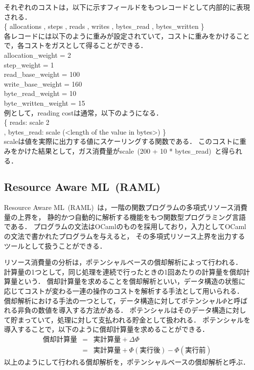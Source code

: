 \documentclass{kuisthesis}
\begin{document}
それぞれのコストは，以下に示すフィールドをもつレコードとして内部的に表現される．\\
\hspace{15pt}\{ allocations 
, steps 
, reads 
, writes 
, bytes\_read 
, bytes\_written 
\} \\
各レコードには以下のように重みが設定されていて，コストに重みをかけることで，各コストをガスとして得ることができる．\\
\hspace{15pt} allocation\_weight = 2 \\
\hspace{15pt} step\_weight = 1 \\
\hspace{15pt} read\_base\_weight = 100 \\
\hspace{15pt} write\_base\_weight = 160 \\
\hspace{15pt} byte\_read\_weight = 10 \\
\hspace{15pt} byte\_written\_weight = 15 \\
例として，reading costは通常，以下のようになる． \\
\hspace{15pt} \{ reads: scale 2 \\
\hspace{15pt} , bytes\_read: scale (<length of the value in bytes>) \} \\
scaleは値を実際に出力する値にスケーリングする関数である．
このコストに重みをかけた結果として，ガス消費量がscale\ (200 + 10 * bytes\_read)\ と得られる．




\subsection{Resource Aware ML\ (RAML)}\label{subsec-pre-raml}
Resource Aware ML\ (RAML)\ は，一階の関数プログラムの多項式リソース消費量の上界を，
静的かつ自動的に解析する機能をもつ関数型プログラミング言語である．
プログラムの文法はOCamlのものを採用しており，入力としてOCamlの文法で書かれたプログラムを与えると，
その多項式リソース上界を出力するツールとして扱うことができる．

リソース消費量の分析は，ポテンシャルベースの償却解析によって行われる\cite{amortized}．
計算量の1つとして，同じ処理を連続で行ったときの1回あたりの計算量を償却計算量という．
償却計算量を求めることを償却解析といい，データ構造の状態に応じてコストが変わる一連の操作のコストを解析する手法として用いられる．
償却解析における手法の一つとして，データ構造に対してポテンシャル$\Phi$と呼ばれる非負の数値を導入する方法がある．
ポテンシャルはそのデータ構造に対して貯まっていて，処理に対して支払われる貯金として扱われる．
ポテンシャルを導入することで，以下のように償却計算量を求めることができる．
\begin{eqnarray*}
  \mbox{償却計算量}&=&\mbox{実計算量}+\Delta \Phi \\
  &=&\mbox{実計算量}+\Phi (\mbox{実行後})-\Phi(\mbox{実行前})
\end{eqnarray*}
以上のようにして行われる償却解析を，ポテンシャルベースの償却解析と呼ぶ．
\end{document}
